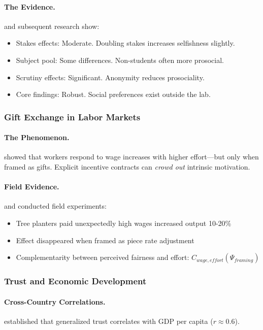 \paragraph{The Evidence.}
\citet{levittlist2007} and subsequent research show:
\begin{itemize}
  \item Stakes effects: Moderate. Doubling stakes increases selfishness slightly.
  \item Subject pool: Some differences. Non-students often more prosocial.
  \item Scrutiny effects: Significant. Anonymity reduces prosociality.
  \item Core findings: Robust. Social preferences exist outside the lab.
\end{itemize}

\subsubsection{Gift Exchange in Labor Markets}

\paragraph{The Phenomenon.}
\citet{gneezyrustichini2000} showed that workers respond to wage increases
with higher effort---but only when framed as gifts.
Explicit incentive contracts can \emph{crowd out} intrinsic motivation.

\paragraph{Field Evidence.}
\citet{fehretal2009} and \citet{listmillimet2008} conducted field experiments:
\begin{itemize}
  \item Tree planters paid unexpectedly high wages increased output 10-20\%
  \item Effect disappeared when framed as piece rate adjustment
  \item Complementarity between perceived fairness and effort: $C_{wage,effort}(\Psi_{framing})$
\end{itemize}

\subsubsection{Trust and Economic Development}

\paragraph{Cross-Country Correlations.}
\citet{knackzak} established that generalized trust correlates with GDP per capita ($r \approx 0.6$).


